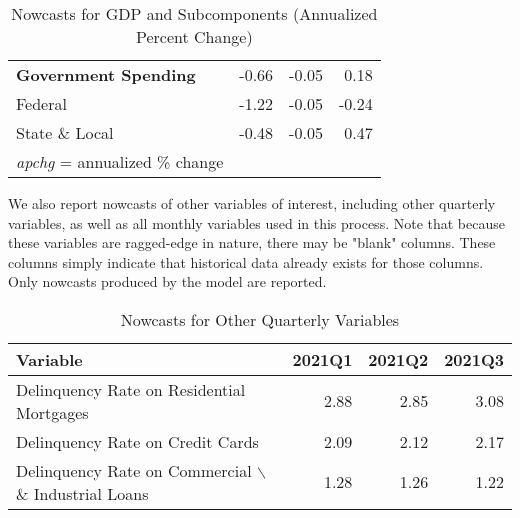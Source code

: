\documentclass[11pt, letterpaper]{article}\usepackage[]{graphicx}\usepackage[]{color}
\begin{document}
\begin{table}[H]
\begin{tabular}{lrrr}
  \hspace{0mm} \textbf{Government Spending} & -0.66 & -0.05 & 0.18 \\ 
  \hspace{8mm}  Federal & -1.22 & -0.05 & -0.24 \\ 
  \hspace{8mm}  State \& Local & -0.48 & -0.05 & 0.47 \\ 
   \hline 
 \textit{apchg} = annualized \% change 
\end{tabular}
\endgroup
\caption{Nowcasts for GDP and Subcomponents (Annualized Percent Change)} 
\end{table}


We also report nowcasts of other variables of interest, including other quarterly variables, as well as all monthly variables used in this process. Note that because these variables are ragged-edge in nature, there may be "blank" columns. These columns simply indicate that historical data already exists for those columns. Only nowcasts produced by the model are reported.
\begin{table}[H]
\centering
\begingroup\fontsize{11pt}{13pt}\selectfont
\begin{tabular}{lrrr}
  \hline
Variable & 2021Q1 & 2021Q2 & 2021Q3 \\ 
  \hline
Delinquency Rate on Residential Mortgages & 2.88 & 2.85 & 3.08 \\ 
  Delinquency Rate on Credit Cards & 2.09 & 2.12 & 2.17 \\ 
  Delinquency Rate on Commercial $\backslash$\& Industrial Loans & 1.28 & 1.26 & 1.22 \\ 
   \hline
\end{tabular}
\endgroup
\caption{Nowcasts for Other Quarterly Variables} 
\end{table}
\end{document}
